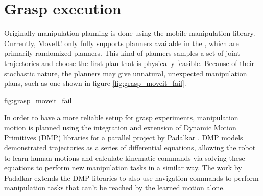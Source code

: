 \section{Grasp execution}

Originally manipulation planning is done using the  mobile manipulation
library. Currently, MoveIt! only fully supports planners available in the , which are primarily randomized planners. This kind of planners samples a set of
joint trajectories and choose the first plan that is physically feasible. Because of their stochastic nature, the
planners may give unnatural, unexpected manipulation plans, such as one shown in figure \ref{fig:grasp_moveit_fail}.

             {fig:grasp_moveit_fail}{\textwidth}

In order to have a more reliable setup for grasp experiments, manipulation motion is planned using the integration and
extension of Dynamic Motion Primitives (DMP) libraries for a parallel project by Padalkar \cite{Padalkar2018}. DMP
models demonstrated trajectories as a series of differential equations, allowing the robot to learn human motions and
calculate kinematic commands via solving these equations to perform new manipulation tasks in a similar way. The work
by Padalkar extends the DMP libraries to also use navigation commands to perform manipulation tasks that can't be
reached by the learned motion alone.

